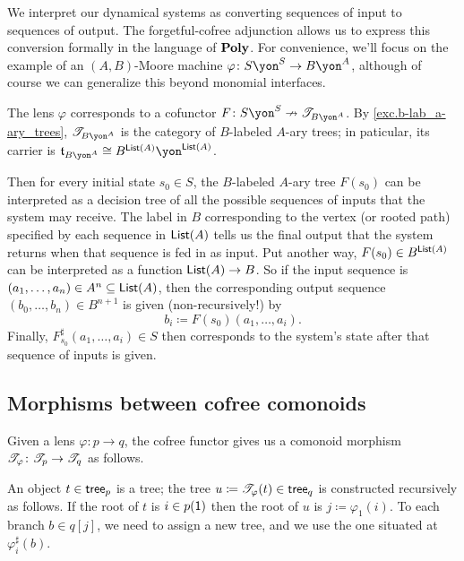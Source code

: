 \documentclass[Book-Poly]{subfiles}
\begin{document}
\begin{example} \label{ex.input_output}
We interpret our dynamical systems as converting sequences of input to sequences of output.
The forgetful-cofree adjunction allows us to express this conversion formally in the language of $\mathbf{Poly}$.
For convenience, we'll focus on the example of an $(A,B)$-Moore machine $\varphi\colon S\yon^S\to B\yon^A$, although of course we can generalize this beyond monomial interfaces.

The lens $\varphi$ corresponds to a cofunctor $F\colon S\yon^S\cof\cofree{B\yon^A}$.
By \cref{exc.b-lab_a-ary_trees}, $\cofree{B\yon^A}$ is the category of $B$-labeled $A$-ary trees; in paticular, its carrier is $\car{t}_{B\yon^A}\iso B^{\lst(A)}\yon^{\lst(A)}$.

Then for every initial state $s_0\in S$, the $B$-labeled $A$-ary tree $F(s_0)$ can be interpreted as a decision tree of all the possible sequences of inputs that the system may receive.
The label in $B$ corresponding to the vertex (or rooted path) specified by each sequence in $\mathsf{List}(A)$ tells us the final output that the system returns when that sequence is fed in as input.
Put another way, $F(s_0)\in B^{\mathsf{List}(A)}$ can be interpreted as a function $\mathsf{List}(A)\to B$.
So if the input sequence is $(a_1,\ldots,a_n)\in A^n\subseteq\mathsf{List}(A)$, then the corresponding output sequence $(b_0,\ldots,b_n)\in B^{n+1}$ is given (non-recursively!) by
\[
    b_i\coloneqq F(s_0)(a_1,\ldots,a_i).
\]
Finally, $F^\sharp_{s_0}(a_1,\ldots,a_i)\in S$ then corresponds to the system's state after that sequence of inputs is given.
\end{example}

\subsection{Morphisms between cofree comonoids}
Given a lens $\varphi \colon p \to q$, the cofree functor gives us a comonoid morphism $\mathscr{T}_{\varphi}\colon\mathscr{T}_{p}\to\mathscr{T}_{q}$ as follows.

An object $t \in \mathsf{tree}_p$ is a tree; the tree $u \coloneqq \mathscr{T}_{\varphi} (t) \in \mathsf{tree}_q $ is constructed recursively as follows. If the root of $t$ is $i \in p(\textsf{1})$ then the root of $u$ is $j \coloneqq \varphi_1 (i)$. To each branch $b \in q[j]$, we need to assign a new tree, and we use the one situated at $\varphi_i ^ \sharp (b)$.
\end{document}
